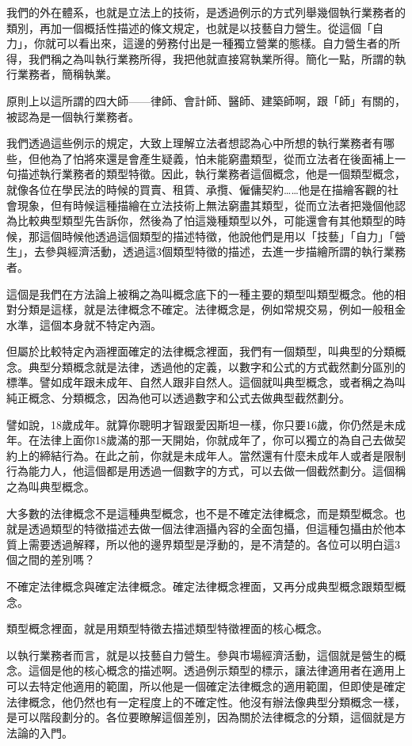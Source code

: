 \documentclass[]{ctexbook}
\begin{document}
我們的外在體系，也就是立法上的技術，是透過例示的方式列舉幾個執行業務者的類別，再加一個概括性描述的條文規定，也就是以技藝自力營生。從這個「自力」，你就可以看出來，這邊的勞務付出是一種獨立營業的態樣。自力營生者的所得，我們稱之為叫執行業務所得，我把他就直接寫執業所得。簡化一點，所謂的執行業務者，簡稱執業。

原則上以這所謂的四大師------律師、會計師、醫師、建築師啊，跟「師」有關的，被認為是一個執行業務者。

我們透過這些例示的規定，大致上理解立法者想認為心中所想的執行業務者有哪些，但他為了怕將來還是會產生疑義，怕未能窮盡類型，從而立法者在後面補上一句描述執行業務者的類型特徵。因此，執行業務者這個概念，他是一個類型概念，就像各位在學民法的時候的買賣、租賃、承攬、僱傭契約\ldots\ldots 他是在描繪客觀的社會現象，但有時候這種描繪在立法技術上無法窮盡其類型，從而立法者把幾個他認為比較典型類型先告訴你，然後為了怕這幾種類型以外，可能還會有其他類型的時候，那這個時候他透過這個類型的描述特徵，他說他們是用以「技藝」「自力」「營生」，去參與經濟活動，透過這3個類型特徵的描述，去進一步描繪所謂的執行業務者。

這個是我們在方法論上被稱之為叫概念底下的一種主要的類型叫類型概念。他的相對分類是這樣，就是法律概念不確定。法律概念是，例如常規交易，例如一般租金水準，這個本身就不特定內涵。

但屬於比較特定內涵裡面確定的法律概念裡面，我們有一個類型，叫典型的分類概念。典型分類概念就是法律，透過他的定義，以數字和公式的方式截然劃分區別的標準。譬如成年跟未成年、自然人跟非自然人。這個就叫典型概念，或者稱之為叫純正概念、分類概念，因為他可以透過數字和公式去做典型截然劃分。

譬如說，18歲成年。就算你聰明才智跟愛因斯坦一樣，你只要16歲，你仍然是未成年。在法律上面你18歲滿的那一天開始，你就成年了，你可以獨立的為自己去做契約上的締結行為。在此之前，你就是未成年人。當然還有什麼未成年人或者是限制行為能力人，他這個都是用透過一個數字的方式，可以去做一個截然劃分。這個稱之為叫典型概念。

大多數的法律概念不是這種典型概念，也不是不確定法律概念，而是類型概念。也就是透過類型的特徵描述去做一個法律涵攝內容的全面包攝，但這種包攝由於他本質上需要透過解釋，所以他的邊界類型是浮動的，是不清楚的。各位可以明白這3個之間的差別嗎？

不確定法律概念與確定法律概念。確定法律概念裡面，又再分成典型概念跟類型概念。

類型概念裡面，就是用類型特徵去描述類型特徵裡面的核心概念。

以執行業務者而言，就是以技藝自力營生。參與市場經濟活動，這個就是營生的概念。這個是他的核心概念的描述啊。透過例示類型的標示，讓法律適用者在適用上可以去特定他適用的範圍，所以他是一個確定法律概念的適用範圍，但即使是確定法律概念，他仍然也有一定程度上的不確定性。他沒有辦法像典型分類概念一樣，是可以階段劃分的。各位要瞭解這個差別，因為關於法律概念的分類，這個就是方法論的入門。
\end{document}
